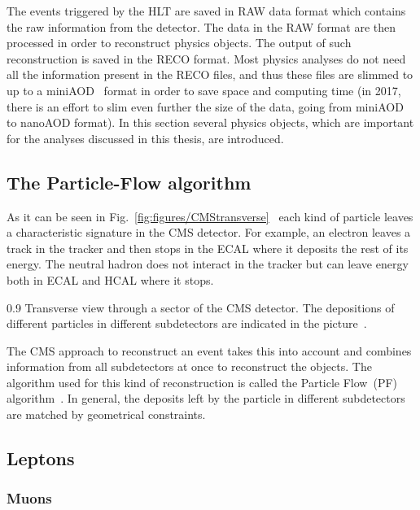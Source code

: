 The events triggered by the HLT are saved in RAW data format which contains the raw information from the detector. The data in the RAW format are then processed in order to reconstruct physics objects. The output of such reconstruction is saved in the RECO format. Most physics analyses do not need all the information present in the RECO files, and thus these files are slimmed to up to a miniAOD~\cite{Petrucciani:2029414} format in order to save space and computing time (in 2017, there is an effort to slim even further the size of the data, going from miniAOD to nanoAOD format). In this section several physics objects, which are important for the analyses discussed in this thesis, are introduced.


\subsection{The Particle-Flow algorithm}

As it can be seen in Fig.~\ref{fig:figures/CMStransverse}~\cite{Sirunyan:2017ulk} each kind of particle leaves a characteristic signature in the CMS detector. For example, an electron leaves a track in the tracker and then stops in the ECAL where it deposits the rest of its energy. The neutral hadron does not interact in the tracker but can leave energy both in ECAL and  HCAL where it stops.

                 {0.9}       %
                 { Transverse view through a sector of the CMS detector. The depositions of different particles in different subdetectors are indicated in the picture~\cite{Sirunyan:2017ulk}. }

The CMS approach to reconstruct an event takes this into account and combines information from all subdetectors at once to reconstruct the objects. The algorithm used for this kind of reconstruction is called the Particle Flow~(PF) algorithm~\cite{Sirunyan:2017ulk}. In general, the deposits left by the particle in different subdetectors are matched by geometrical constraints.


\subsection{Leptons}

\subsubsection{Muons}

